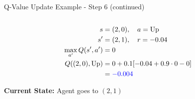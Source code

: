 \documentclass[aspectratio=169]{beamer}
\begin{document}
\begin{frame}{Q-Value Update Example - Step 6 (continued)}
\begin{columns}
        \begin{column}{0.5\textwidth}
            
            \begin{align}
                s &= (2,0), \quad a = \text{Up} \\
                s' &= (2,1), \quad r = -0.04 \\
                \max_{a'}Q(s',a') &= 0 \\
                Q((2,0),\text{Up}) &= 0 + 0.1[-0.04 + 0.9 \cdot 0 - 0] \\
                &= \textcolor{blue}{-0.004}
            \end{align}
            
            \vspace{0.5cm}
            \textbf{Current State:} Agent goes to $(2,1)$
        \end{column}
    \end{columns}
\end{frame}
\end{document}

